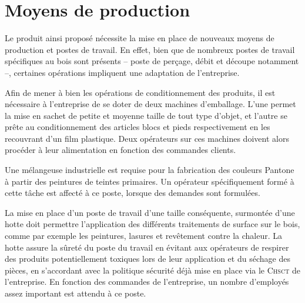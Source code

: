 \section{Moyens de production}

Le produit ainsi proposé nécessite la mise en place de nouveaux
moyens de production et postes de travail. En effet, bien que de nombreux
postes de travail spécifiques au bois sont présents -- poste de perçage,
débit et découpe notamment --, certaines opérations impliquent une adaptation
de l'entreprise.

Afin de mener à bien les opérations de conditionnement des produits,
il est nécessaire à l'entreprise de se doter de deux machines d'emballage.
L'une permet la mise en sachet de petite et moyenne taille de tout type
d'objet, et l'autre se prête au conditionnement des articles blocs et pieds
respectivement en les recouvrant d'un film plastique.
Deux opérateurs sur ces machines doivent alors procéder à leur alimentation
en fonction des commandes clients.

Une mélangeuse industrielle est requise pour la fabrication des couleurs
Pantone\textregistered{} à partir des peintures de teintes primaires.
Un opérateur spécifiquement formé à cette tâche est affecté à ce poste,
lorsque des demandes sont formulées.

La mise en place d'un poste de travail d'une taille conséquente, surmontée
d'une hotte doit permettre l'application des différents traitements de
surface sur le bois, comme par exemple les peintures, lasures et revêtement
contre la chaleur. La hotte assure la sûreté du poste du travail en évitant
aux opérateurs de respirer des produits potentiellement toxiques lors de
leur application et du séchage des pièces, en s'accordant avec la politique
sécurité déjà mise en place via le \textsc{Chsct} de l'entreprise.
En fonction des commandes de l'entreprise, un nombre d'employés assez
important est attendu à ce poste.
